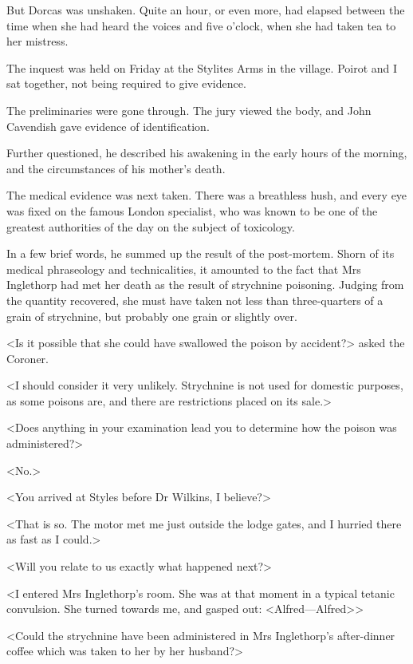  But Dorcas was unshaken. Quite an hour, or even more, had elapsed between the time when she had heard the voices and five o'clock, when she had taken tea to her mistress. 

 The inquest was held on Friday at the Stylites Arms in the village. Poirot and I sat together, not being required to give evidence. 

 The preliminaries were gone through. The jury viewed the body, and John Cavendish gave evidence of identification. 

 Further questioned, he described his awakening in the early hours of the morning, and the circumstances of his mother's death. 

 The medical evidence was next taken. There was a breathless hush, and every eye was fixed on the famous London specialist, who was known to be one of the greatest authorities of the day on the subject of toxicology. 

 In a few brief words, he summed up the result of the post-mortem. Shorn of its medical phraseology and technicalities, it amounted to the fact that Mrs Inglethorp had met her death as the result of strychnine poisoning. Judging from the quantity recovered, she must have taken not less than three-quarters of a grain of strychnine, but probably one grain or slightly over. 

 <Is it possible that she could have swallowed the poison by accident?> asked the Coroner. 

 <I should consider it very unlikely. Strychnine is not used for domestic purposes, as some poisons are, and there are restrictions placed on its sale.> 

 <Does anything in your examination lead you to determine how the poison was administered?> 

 <No.> 

 <You arrived at Styles before Dr Wilkins, I believe?> 

 <That is so. The motor met me just outside the lodge gates, and I hurried there as fast as I could.> 

 <Will you relate to us exactly what happened next?> 

 <I entered Mrs Inglethorp's room. She was at that moment in a typical tetanic convulsion. She turned towards me, and gasped out: <Alfred—Alfred\longdash>> 

 <Could the strychnine have been administered in Mrs Inglethorp's after-dinner coffee which was taken to her by her husband?> 

